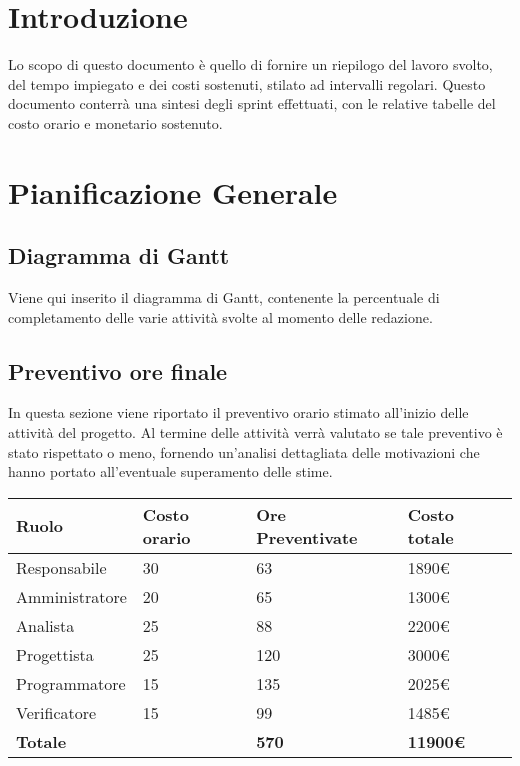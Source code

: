 \documentclass[12pt]{article}
\begin{document}
\section{Introduzione}
Lo scopo di questo documento è quello di fornire un riepilogo del lavoro svolto, del tempo impiegato e dei costi sostenuti, stilato ad intervalli regolari.
Questo documento conterrà una sintesi degli sprint effettuati, con le relative tabelle del costo orario e monetario sostenuto.

\section{Pianificazione Generale}
\subsection{Diagramma di Gantt}
Viene qui inserito il diagramma di Gantt, contenente la percentuale di completamento delle varie attività svolte al momento delle redazione.
\begin{center}
\end{center}


\subsection{Preventivo ore finale}
In questa sezione viene riportato il preventivo orario stimato all'inizio delle attività del progetto. Al termine delle attività verrà valutato se tale preventivo è stato rispettato o meno, fornendo un'analisi dettagliata delle motivazioni che hanno portato all'eventuale superamento delle stime.
\begin{center}  
    \begin{tabular}{|l|l|l|l|}
        \hline
        \textbf{Ruolo} & \textbf{Costo orario} & \textbf{Ore Preventivate} & \textbf{Costo totale}\\
        \hline
        Responsabile & 30 & 63 & 1890\euro  \\ 
        \hline
        Amministratore & 20 & 65 & 1300\euro \\
        \hline
        Analista & 25 & 88 & 2200\euro \\
        \hline
        Progettista & 25 & 120 & 3000\euro \\
        \hline
        Programmatore & 15 & 135 & 2025\euro \\
        \hline
        Verificatore & 15 & 99 & 1485\euro \\
        \hline
        \textbf{Totale} &  & \textbf{570} & \textbf{11900\euro} \\
        \hline
    \end{tabular}
\end{center}
\end{document}
